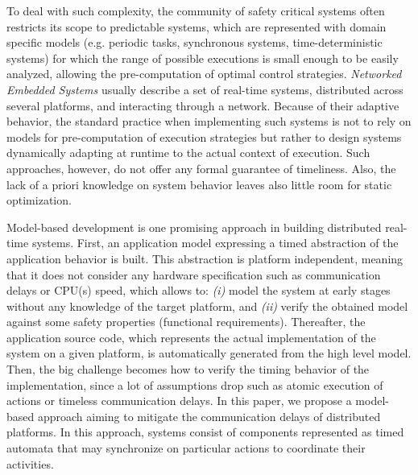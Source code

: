 To deal with such complexity, the community of safety critical systems 
often restricts its scope to predictable systems, which are represented 
with domain specific models (e.g. periodic tasks, synchronous systems, 
time-deterministic systems) for which the range of possible executions 
is small enough to be easily analyzed, allowing the pre-computation 
of optimal control strategies.
\emph{Networked Embedded Systems} usually describe a set of real-time systems, 
distributed across several platforms, and interacting through a network. 
Because of their adaptive behavior, the standard practice when implementing 
such systems is not to rely on models for pre-computation of execution strategies but rather 
to design systems dynamically adapting at runtime to the actual context of execution.
Such approaches, however, do not offer any formal guarantee of timeliness. Also, 
the lack of a priori knowledge on system behavior leaves also little room for 
static optimization.

Model-based development is one promising approach in building distributed 
real-time systems. First, an application model expressing a timed abstraction
of the application behavior is built. This abstraction is platform 
independent, meaning that it does not consider any hardware specification
such as communication delays or CPU(s) speed, which allows to: 
\emph{(i)} model the system at early stages 
without any knowledge of the target platform, and \emph{(ii)} verify 
the obtained model against some safety properties (functional requirements).
Thereafter, the application source code, which represents the actual 
implementation of the system on a given platform, 
is automatically generated from the high level model. 
Then, the big challenge becomes  
how to verify the timing behavior of the implementation, since a lot of 
assumptions drop such as atomic execution of actions or timeless communication delays. 
In this paper, we propose a model-based approach aiming to mitigate the communication delays of 
distributed platforms. 
In this approach, systems consist of components represented 
as timed automata that may synchronize on particular actions to coordinate 
their activities. 

